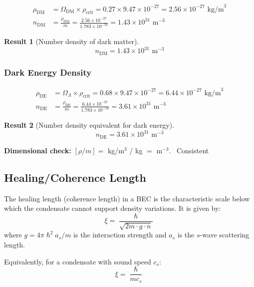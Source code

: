 \documentclass[11pt,a4paper]{article}
\newcommand{\ee}[1]{\times 10^{#1}}
\newcommand{\hbar}{\ensuremath{\hslash}}
\newcommand{\rhocrit}{\ensuremath{\rho_{\mathrm{crit}}}}
\newcommand{\rhoDM}{\ensuremath{\rho_{\mathrm{DM}}}}
\newcommand{\rhoDE}{\ensuremath{\rho_{\mathrm{DE}}}}
\newcommand{\CONSISTENT}{\textcolor{green!60!black}{\checkmark~Consistent}}
\newtheorem{result}{Result}
\begin{document}
\begin{align}
\rhoDM &= \Omega_{\mathrm{DM}} \times \rhocrit = 0.27 \times 9.47 \ee{-27} = 2.56 \ee{-27} \text{ kg/m}^3 \\
n_{\mathrm{DM}} &= \frac{\rhoDM}{m} = \frac{2.56 \ee{-27}}{1.783 \ee{-58}} = 1.43 \ee{31} \text{ m}^{-3}
\end{align}

\begin{result}[Number density of dark matter]
\begin{equation}
\boxed{n_{\mathrm{DM}} = 1.43 \times 10^{31} \text{ m}^{-3}}
\end{equation}
\end{result}

\subsubsection{Dark Energy Density}

\begin{align}
\rhoDE &= \Omega_\Lambda \times \rhocrit = 0.68 \times 9.47 \ee{-27} = 6.44 \ee{-27} \text{ kg/m}^3 \\
n_{\mathrm{DE}} &= \frac{\rhoDE}{m} = \frac{6.44 \ee{-27}}{1.783 \ee{-58}} = 3.61 \ee{31} \text{ m}^{-3}
\end{align}

\begin{result}[Number density equivalent for dark energy]
\begin{equation}
\boxed{n_{\mathrm{DE}} = 3.61 \times 10^{31} \text{ m}^{-3}}
\end{equation}
\end{result}

\textbf{Dimensional check:} $[\rho/m] = $ kg/m$^3$ / kg $=$ m$^{-3}$. \CONSISTENT

\subsection{Healing/Coherence Length}
\label{sec:healing}

The healing length (coherence length) in a BEC is the characteristic scale below which the condensate cannot support density variations. It is given by:
\begin{equation}
\xi = \frac{\hbar}{\sqrt{2m \cdot g \cdot n}}
\end{equation}
where $g = 4\pi\hbar^2 a_s/m$ is the interaction strength and $a_s$ is the $s$-wave scattering length.

Equivalently, for a condensate with sound speed $c_s$:
\begin{equation}
\xi = \frac{\hbar}{m c_s}
\end{equation}
\end{document}
